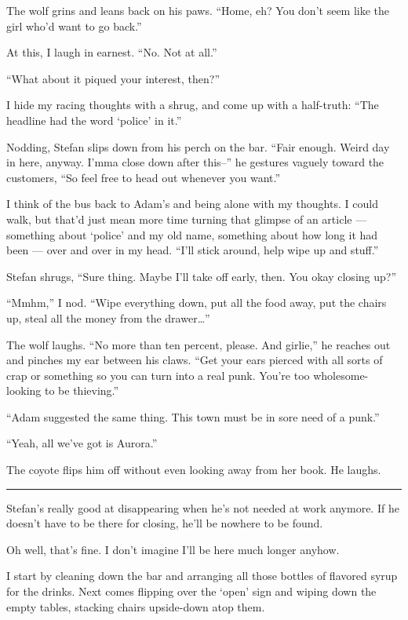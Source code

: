 The wolf grins and leans back on his paws. ``Home, eh? You don't seem like the girl who'd want to go back.''

At this, I laugh in earnest. ``No. Not at all.''

``What about it piqued your interest, then?''

I hide my racing thoughts with a shrug, and come up with a half-truth: ``The headline had the word `police' in it.''

Nodding, Stefan slips down from his perch on the bar. ``Fair enough. Weird day in here, anyway. I'mma close down after this--'' he gestures vaguely toward the customers, ``So feel free to head out whenever you want.''

I think of the bus back to Adam's and being alone with my thoughts. I could walk, but that'd just mean more time turning that glimpse of an article --- something about `police' and my old name, something about how long it had been --- over and over in my head. ``I'll stick around, help wipe up and stuff.''

Stefan shrugs, ``Sure thing. Maybe I'll take off early, then. You okay closing up?''

``Mmhm,'' I nod. ``Wipe everything down, put all the food away, put the chairs up, steal all the money from the drawer\ldots{}''

The wolf laughs. ``No more than ten percent, please. And girlie,'' he reaches out and pinches my ear between his claws. ``Get your ears pierced with all sorts of crap or something so you can turn into a real punk. You're too wholesome-looking to be thieving.''

``Adam suggested the same thing. This town must be in sore need of a punk.''

``Yeah, all we've got is Aurora.''

The coyote flips him off without even looking away from her book. He laughs.

\begin{center}\rule{0.5\linewidth}{\linethickness}\end{center}

Stefan's really good at disappearing when he's not needed at work anymore. If he doesn't have to be there for closing, he'll be nowhere to be found.

Oh well, that's fine. I don't imagine I'll be here much longer anyhow.

I start by cleaning down the bar and arranging all those bottles of flavored syrup for the drinks. Next comes flipping over the `open' sign and wiping down the empty tables, stacking chairs upside-down atop them.

